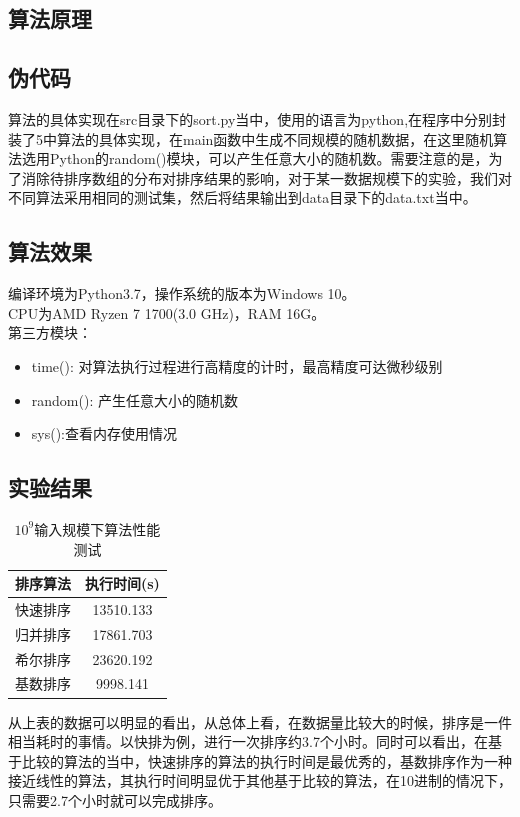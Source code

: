 \documentclass[UTF8]{ctexart}
\begin{document}
\subsection{算法原理}

\subsection{伪代码}

算法的具体实现在src目录下的sort.py当中，使用的语言为python,在程序中分别封装了5中算法的具体实现，在main函数中生成不同规模的随机数据，在这里随机算法选用Python的random()模块，可以产生任意大小的随机数。需要注意的是，为了消除待排序数组的分布对排序结果的影响，对于某一数据规模下的实验，我们对不同算法采用相同的测试集，然后将结果输出到data目录下的data.txt当中。

\subsection{算法效果}
编译环境为Python3.7，操作系统的版本为Windows 10。\\
CPU为AMD Ryzen 7 1700(3.0 GHz)，RAM 16G。\\
第三方模块：
\begin{itemize}
\item time(): 对算法执行过程进行高精度的计时，最高精度可达微秒级别
\item random(): 产生任意大小的随机数
\item sys():查看内存使用情况
\end{itemize}

\subsection{实验结果}


\begin{table}[H]
    \caption{$10^9$输入规模下算法性能测试}
    \label{table-1}
    \begin{center}
        \begin{tabular}{cc}
            \hline
            排序算法&   执行时间(s)\\     
            \hline
            快速排序&       13510.133\\               
            归并排序&       17861.703\\              
            希尔排序&       23620.192\\             
            基数排序&      9998.141\\                      
            \hline
        \end{tabular}  
    \end{center}
\end{table}

从上表的数据可以明显的看出，从总体上看，在数据量比较大的时候，排序是一件相当耗时的事情。以快排为例，进行一次排序约3.7个小时。同时可以看出，在基于比较的算法的当中，快速排序的算法的执行时间是最优秀的，基数排序作为一种接近线性的算法，其执行时间明显优于其他基于比较的算法，在10进制的情况下，只需要2.7个小时就可以完成排序。
\end{document}
